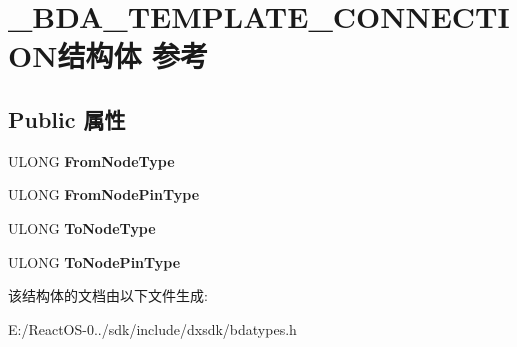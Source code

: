 \hypertarget{struct___b_d_a___t_e_m_p_l_a_t_e___c_o_n_n_e_c_t_i_o_n}{}\section{\+\_\+\+B\+D\+A\+\_\+\+T\+E\+M\+P\+L\+A\+T\+E\+\_\+\+C\+O\+N\+N\+E\+C\+T\+I\+O\+N结构体 参考}
\label{struct___b_d_a___t_e_m_p_l_a_t_e___c_o_n_n_e_c_t_i_o_n}
\subsection*{Public 属性}
\begin{DoxyCompactItemize}
\item 
\mbox{\label{struct___b_d_a___t_e_m_p_l_a_t_e___c_o_n_n_e_c_t_i_o_n_a440e2b47ac04ff2c5268d6e3691c115f}} 
U\+L\+O\+NG {\bfseries From\+Node\+Type}
\item 
\mbox{\label{struct___b_d_a___t_e_m_p_l_a_t_e___c_o_n_n_e_c_t_i_o_n_a70a455886b532e2284718c8588ca495b}} 
U\+L\+O\+NG {\bfseries From\+Node\+Pin\+Type}
\item 
\mbox{\label{struct___b_d_a___t_e_m_p_l_a_t_e___c_o_n_n_e_c_t_i_o_n_aa4467cc2fbc85818368aa456c8f905d1}} 
U\+L\+O\+NG {\bfseries To\+Node\+Type}
\item 
\mbox{\label{struct___b_d_a___t_e_m_p_l_a_t_e___c_o_n_n_e_c_t_i_o_n_aa0e1270f8b9b59ab6fc075b9c6ef17cc}} 
U\+L\+O\+NG {\bfseries To\+Node\+Pin\+Type}
\end{DoxyCompactItemize}


该结构体的文档由以下文件生成\+:\begin{DoxyCompactItemize}
\item 
E\+:/\+React\+O\+S-\/0../sdk/include/dxsdk/bdatypes.\+h\end{DoxyCompactItemize}

